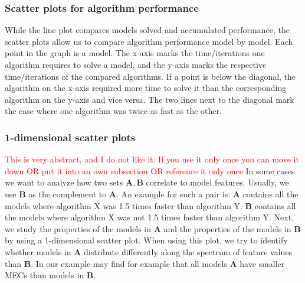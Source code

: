 \subsubsection*{Scatter plots for algorithm performance} \label{plot:performanceScatter}
While the line plot compares models solved and accumulated performance, the scatter plots allow us to compare algorithm performance model by model.
Each point in the graph is a model. The x-axis marks the time/iterations one algorithm requires to solve a model, and the y-axis marks the respective time/iterations of the compared algorithms.
If a point is below the diagonal, the algorithm on the x-axis required more time to solve it than the corresponding algorithm on the y-axis and vice versa.
The two lines next to the diagonal mark the case where one algorithm was twice as fast as the other.

\subsubsection*{1-dimensional scatter plots} \label{plot:1Dscatter}
\textcolor{red}{This is very abstract, and I do not like it. If you use it only once you can move it down OR put it into an own subsection OR reference it only once}
In some cases we want to analyze how two sets $\mathbf{A}, \mathbf{B}$ correlate to model features. 
Usually, we use $\mathbf{B}$ as the complement to $\mathbf{A}$.
An example for such a pair is: 
$\mathbf{A}$ contains all the models where algorithm X was 1.5 times faster than algorithm Y.
$\mathbf{B}$ contains all the models where algorithm X was not 1.5 times faster than algorithm Y.
Next, we study the properties of the models in $\mathbf{A}$ and the properties of the models in $\mathbf{B}$ 
by using a 1-dimensional scatter plot. When using this plot, we try to identify whether models in $\mathbf{A}$ distribute
differently along the spectrum of feature values than $\mathbf{B}$.
In our example may find for example that all models $\mathbf{A}$ have smaller MECs than models in $\mathbf{B}$. 

